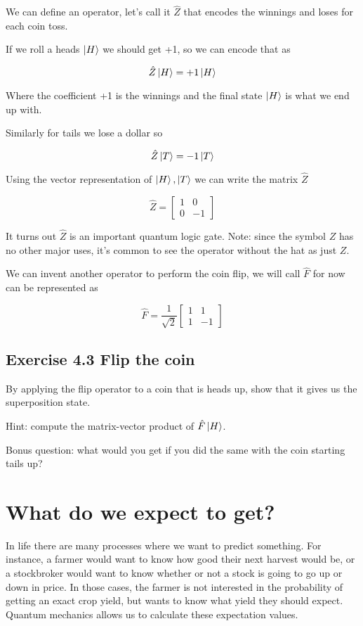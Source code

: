 \documentclass{book}
\begin{document}
We can define an operator, let's call it $\hat{Z}$ that encodes the winnings and loses for each coin toss. 

If we roll a heads $\ket{H}$ we should get +1, so we can encode that as 

$$
\hat{Z}\ket{H} = +1 \ket{H}
$$

Where the coefficient +1 is the winnings and the final state $\ket{H}$ is what we end up with. 

Similarly for tails we lose a dollar so 

$$
\hat{Z}\ket{T} = -1 \ket{T}
$$

Using the vector representation of $\ket{H}, \ket{T}$ we can write the matrix $\hat{Z}$

$$ \hat{Z} = \begin{bmatrix} 1 & 0 \\ 0 & -1 \end{bmatrix} $$

It turns out $\hat{Z}$ is an important quantum logic gate. Note: since the symbol $Z$ has no other major uses, it's common to see the operator without the hat as just $Z$.


We can invent another operator to perform the coin flip, we will call $\hat{F}$ for now can be represented as 

$$
\hat{F} =  \frac{1}{\sqrt{2}} \begin{bmatrix} 1 & 1 \\ 1 & -1 \end{bmatrix}
$$

\hline
\subsection{Exercise 4.3 Flip the coin}   

By applying the flip operator to a coin that is heads up, show that it gives us the superposition state.  

Hint: compute the matrix-vector product of $\hat{F}\ket{H}$.   
  
Bonus question: what would you get if you did the same with the coin starting tails up?  

\hline

\section{What do we expect to get?}

In life there are many processes where we want to predict something. For instance, a farmer would want to know how good their next harvest would be, or a stockbroker would want to know whether or not a stock is going to go up or down in price. In those cases, the farmer is not interested in the probability of getting an exact crop yield, but wants to know what yield they should expect. Quantum mechanics allows us to calculate these expectation values.
\end{document}

